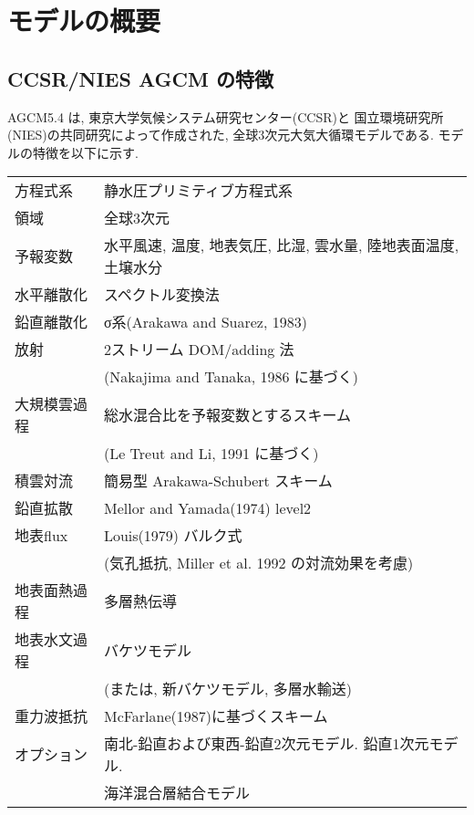 ﻿%


\section{モデルの概要}

\subsection{CCSR/NIES AGCM の特徴}

        AGCM5.4 は, 東京大学気候システム研究センター(CCSR)と
        国立環境研究所(NIES)の共同研究によって作成された, 
        全球3次元大気大循環モデルである. 
        モデルの特徴を以下に示す.

        \begin{center}
        \begin{tabular}{ll}
          方程式系     &  静水圧プリミティブ方程式系  \\
          領域         &  全球3次元  \\
          予報変数     &  水平風速, 温度, 地表気圧, 比湿, 雲水量,
                          陸地表面温度, 土壌水分  \\
          水平離散化   &  スペクトル変換法  \\
          鉛直離散化   &  σ系(Arakawa and Suarez, 1983) \\
          放射         &  2ストリーム DOM/adding 法 \\
                       &  (Nakajima and Tanaka, 1986 に基づく) \\
          大規模雲過程 &  総水混合比を予報変数とするスキーム \\
                       &  (Le Treut and Li, 1991 に基づく) \\
          積雲対流     &  簡易型 Arakawa-Schubert スキーム \\
          鉛直拡散     &  Mellor and Yamada(1974) level2   \\
          地表flux     &  Louis(1979) バルク式 \\
                       &  (気孔抵抗, Miller et al. 1992 の対流効果を考慮) \\
          地表面熱過程 &  多層熱伝導 \\
          地表水文過程 &  バケツモデル \\
                       &  (または, 新バケツモデル, 多層水輸送) \\
          重力波抵抗   &  McFarlane(1987)に基づくスキーム \\
          オプション   &  南北-鉛直および東西-鉛直2次元モデル. 
                          鉛直1次元モデル. \\
                       &  海洋混合層結合モデル
         \end{tabular}
        \end{center}

